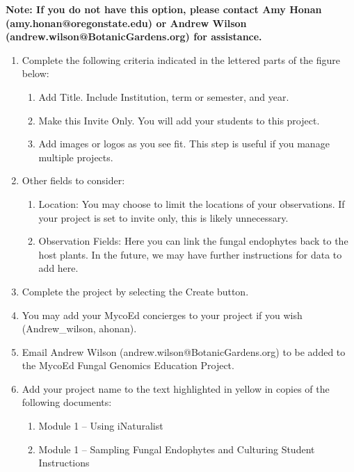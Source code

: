 \documentclass[
  letterpaper,
  DIV=11,
  numbers=noendperiod]{scrreprt}
\providecommand{\tightlist}{%
  \setlength{\itemsep}{0pt}\setlength{\parskip}{0pt}}
\begin{document}
\textbf{Note: If you do not have this option, please contact Amy Honan
(amy.honan@oregonstate.edu) or Andrew Wilson
(andrew.wilson@BotanicGardens.org) for assistance.}

\begin{enumerate}
\def\labelenumi{\arabic{enumi}.}
\setcounter{enumi}{5}
\tightlist
\item
  Complete the following criteria indicated in the lettered parts of the
  figure below:

  \begin{enumerate}
  \def\labelenumii{\alph{enumii}.}
  \tightlist
  \item
    Add Title. Include Institution, term or semester, and year.
  \item
    Make this Invite Only. You will add your students to this project.
  \item
    Add images or logos as you see fit. This step is useful if you
    manage multiple projects.
  \end{enumerate}
\item
  Other fields to consider:

  \begin{enumerate}
  \def\labelenumii{\alph{enumii}.}
  \tightlist
  \item
    Location: You may choose to limit the locations of your
    observations. If your project is set to invite only, this is likely
    unnecessary.
  \item
    Observation Fields: Here you can link the fungal endophytes back to
    the host plants. In the future, we may have further instructions for
    data to add here.
  \end{enumerate}
\item
  Complete the project by selecting the Create button.
\item
  You may add your MycoEd concierges to your project if you wish
  (Andrew\_wilson, ahonan).
\item
  Email Andrew Wilson (andrew.wilson@BotanicGardens.org) to be added to
  the MycoEd Fungal Genomics Education Project.
\item
  Add your project name to the text highlighted in yellow in copies of
  the following documents:

  \begin{enumerate}
  \def\labelenumii{\alph{enumii}.}
  \tightlist
  \item
    Module 1 -- Using iNaturalist
  \item
    Module 1 -- Sampling Fungal Endophytes and Culturing Student
    Instructions
  \end{enumerate}
\end{enumerate}
\end{document}
